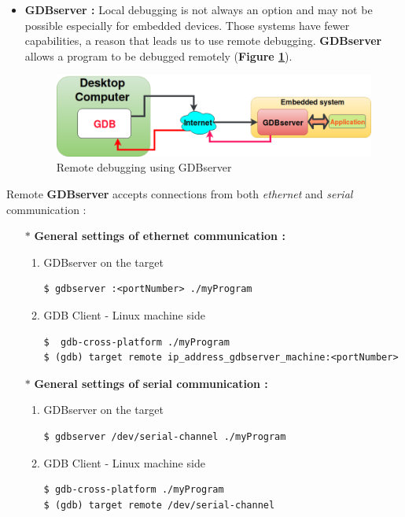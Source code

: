 \begin{itemize}
\begin{itemize}
\end{itemize}	
	
	\item \textbf{GDBserver : }
	Local debugging is not always an option and may not be possible especially for embedded devices. Those systems
have fewer capabilities, a reason that leads us to use remote debugging. \textbf{GDBserver} allows a program to be debugged remotely (\textbf{Figure \ref{Remote debugging using GDBserver}}).

\begin{figure}[H]
		\centering
        \includegraphics[scale=0.40]{img/solution/gdbAndGDBserver.png}
        \caption{Remote debugging using GDBserver}
        \label{Remote debugging using GDBserver}
    \end{figure}
\end{itemize}


Remote \textbf{GDBserver} accepts connections from both \emph{ethernet} and \emph{serial} communication : 
\begin{itemize}
	\item[$\ast$] \textbf{General settings of ethernet communication : } 
		\begin{enumerate}
			\item {GDBserver on the target}
						\begin{lstlisting}[style=BashInputStyle]
$ gdbserver :<portNumber> ./myProgram
						\end{lstlisting}
			\item {GDB Client - Linux machine side}
						\begin{lstlisting}[style=BashInputStyle]
$  gdb-cross-platform ./myProgram
$ (gdb) target remote ip_address_gdbserver_machine:<portNumber>
						\end{lstlisting}
						
		\end{enumerate}				
		
		
	\item[$\ast$] \textbf{General settings of serial communication : }	
		\begin{enumerate}
			\item {GDBserver on the target}
						\begin{lstlisting}[style=BashInputStyle]
$ gdbserver /dev/serial-channel ./myProgram
						\end{lstlisting}			
			\item {GDB Client - Linux machine side}
						\begin{lstlisting}[style=BashInputStyle]
$ gdb-cross-platform ./myProgram
$ (gdb) target remote /dev/serial-channel
						\end{lstlisting}	
		\end{enumerate}
\end{itemize}

